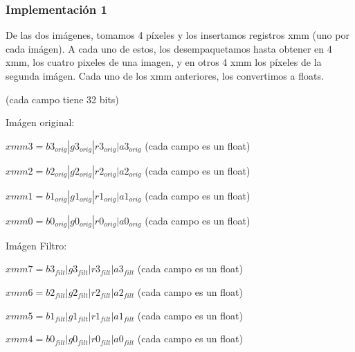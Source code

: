 \documentclass[a4paper]{article}
\begin{document}
\subsubsection{Implementación 1}
De las dos imágenes, tomamos 4 píxeles y los insertamos registros xmm (uno por cada imágen). A cada uno de estos, los desempaquetamos hasta obtener en 4 xmm, los cuatro pixeles de una imagen, y en otros 4 xmm los píxeles de la segunda imágen. Cada uno de los xmm anteriores, los convertimos a floats.
\vspace*{0.3cm}

(cada campo tiene 32 bits)

Imágen original:

\vspace*{0.3cm}

$xmm3 = b3_{orig} | g3_{orig} | r3_{orig} | a3_{orig}$   (cada campo es un float)

\vspace*{0.3cm}

$xmm2 = b2_{orig} | g2_{orig} | r2_{orig} | a2_{orig}$   (cada campo es un float)

\vspace*{0.3cm}

$xmm1 = b1_{orig} | g1_{orig} | r1_{orig} | a1_{orig}$   (cada campo es un float)

\vspace*{0.3cm}

$xmm0 = b0_{orig} | g0_{orig} | r0_{orig} | a0_{orig}$   (cada campo es un float)

\vspace*{0.3cm}

Imágen Filtro:

\vspace*{0.3cm}

$xmm7 = b3_{filt} | g3_{filt} | r3_{filt} | a3_{filt}$   (cada campo es un float)

\vspace*{0.3cm}

$xmm6 = b2_{filt} | g2_{filt} | r2_{filt} | a2_{filt}$   (cada campo es un float)

\vspace*{0.3cm}

$xmm5 = b1_{filt} | g1_{filt} | r1_{filt} | a1_{filt}$   (cada campo es un float)

\vspace*{0.3cm}

$xmm4 = b0_{filt} | g0_{filt} | r0_{filt} | a0_{filt}$   (cada campo es un float)
\end{document}
